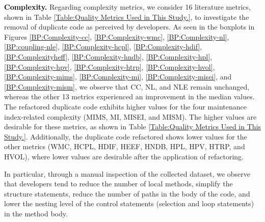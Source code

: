 \noindent\textbf{\textcolor{black}{Complexity.}} Regarding complexity metrics, we consider 16 literature metrics, shown in Table \ref{Table:Quality Metrics Used in This Study.}, to investigate the removal of duplicate code as perceived by developers. As seen in the boxplots in Figures \ref{BP:Complexity-cc}, \ref{BP:Complexity-wmc}, \ref{BP:Complexity-nl}, \ref{BP:coupling-nle}, \ref{BP:Complexity-hcpl}, \ref{BP:Complexity-hdif}, \ref{BP:Complexityheff}, \ref{BP:Complexity-hndb}, \ref{BP:Complexity-hpl}, \ref{BP:Complexity-hpv}, \ref{BP:Complexity-htrp}, \ref{BP:Complexity-hvol}, \ref{BP:Complexity-mims}, \ref{BP:Complexity-mi}, \ref{BP:Complexity-misei}, and \ref{BP:Complexity-mism},  we observe that CC, NL, and NLE remain unchanged, whereas the other 13 metrics experienced an improvement in the median values. The refactored duplicate code exhibits higher values for the four maintenance index-related complexity (\ie MIMS, MI, MISEI, and MISM). The higher values are desirable for these metrics, as shown in Table \ref{Table:Quality Metrics Used in This Study.}. Additionally, the duplicate code refactored shows lower values for the other metrics (\ie WMC, HCPL, HDIF, HEEF, HNDB, HPL, HPV, HTRP, and HVOL), where lower values are desirable after the application of refactoring.




In particular, through a manual inspection of the collected dataset, we observe that developers tend to reduce the number of local methods, simplify the structure statements, reduce the number of paths in the body of the code, and lower the nesting level of the control statements (\eg selection and loop statements) in the method body. %

